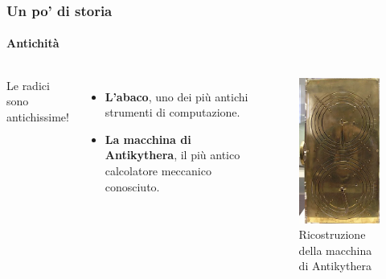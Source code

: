 \documentclass[11pt]{beamer}
\begin{document}
    \begin{frame}
        \frametitle{Un po' di storia}
        \framesubtitle{Antichità}
        
        \begin{columns}
            
            
            Le radici sono antichissime!
            
            \begin{itemize}
                \item \textbf{L'abaco}, uno dei più antichi strumenti di computazione.
                
                \item \textbf{La macchina di Antikythera}, il più antico calcolatore meccanico conosciuto.
            \end{itemize}
        
            \begin{figure}
                \includegraphics[scale=0.3]{img/macchina-antikythera.jpg}
                \caption{Ricostruzione della macchina di Antikythera}
            \end{figure}
        
        \end{columns}   
    \end{frame}
\end{document}
